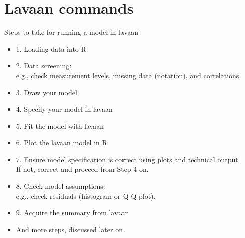 \documentclass[10pt]{beamer}\usepackage[]{graphicx}\usepackage[]{xcolor}
\makeatletter
\newcommand{\hlnum}[1]{\textcolor[rgb]{0.686,0.059,0.569}{#1}}%
\newcommand{\hlsng}[1]{\textcolor[rgb]{0.192,0.494,0.8}{#1}}%
\newcommand{\hlopt}[1]{\textcolor[rgb]{0,0,0}{#1}}%
\newcommand{\hldef}[1]{\textcolor[rgb]{0.345,0.345,0.345}{#1}}%
\newcommand{\hlkwa}[1]{\textcolor[rgb]{0.161,0.373,0.58}{\textbf{#1}}}%
\newcommand{\hlkwb}[1]{\textcolor[rgb]{0.69,0.353,0.396}{#1}}%
\newcommand{\hlkwc}[1]{\textcolor[rgb]{0.333,0.667,0.333}{#1}}%
\newcommand{\hlkwd}[1]{\textcolor[rgb]{0.737,0.353,0.396}{\textbf{#1}}}%
\newenvironment{kframe}{%
 \def\at@end@of@kframe{}%
 \ifinner\ifhmode%
  \def\at@end@of@kframe{\end{minipage}}%
  \begin{minipage}{\columnwidth}%
 \fi\fi%
 \def\FrameCommand##1{\hskip\@totalleftmargin \hskip-\fboxsep
 \colorbox{shadecolor}{##1}\hskip-\fboxsep
     \hskip-\linewidth \hskip-\@totalleftmargin \hskip\columnwidth}%
 \MakeFramed {\advance\hsize-\width
   \@totalleftmargin\z@ \linewidth\hsize
   \@setminipage}}%
 {\par\unskip\endMakeFramed%
 \at@end@of@kframe}
\newenvironment{knitrout}{}{} %
\makeatother
\begin{document}
\section{Lavaan commands}
%
%
\begin{frame}{Steps to take for running a model in lavaan}

\begin{itemize}
\item{1. Loading data into R}
\item{2. Data screening: \\
e.g., check measurement levels, missing data (notation),
and correlations.}
\item{3. Draw your model}
\item{4. Specify your model in lavaan}
\item{5. Fit the model with lavaan}
\item{6. Plot the lavaan model in R}
\item{7. Ensure model specification is correct
using plots and technical output.\\
If not, correct and proceed from Step 4 on.}
\item{8. Check model assumptions: \\
e.g., check residuals (histogram or Q-Q plot).}
\item{9. Acquire the summary from lavaan}
\item{And more steps, discussed later on.}
\end{itemize}

\end{frame}
\end{document}
